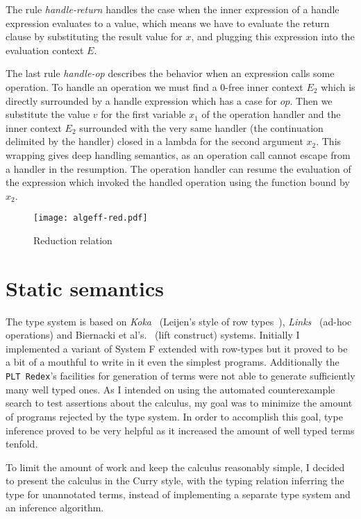 \documentclass[inz, english, longabstract]{iithesis}
\newcommand{\Redex}{\texttt{PLT Redex}}
\begin{document}
The rule \textit{handle-return} handles the case when the inner expression of a handle expression evaluates to a value, which means we have to evaluate the return clause by substituting the result value for $ x $, and plugging this expression into the evaluation context $ E $.

The last rule \textit{handle-op} describes the behavior when an expression calls some operation.
To handle an operation we must find a $0$-free inner context $ E_2 $ which is directly surrounded by a handle expression which has a case for $ op $.
Then we substitute the value $ v $ for the first variable $x_1$ of the operation handler and the inner context $ E_2 $ surrounded with the very same handler (the continuation delimited by the handler) closed in a lambda for the second argument $x_2$.
This wrapping gives deep handling semantics, as an operation call cannot escape from a handler in the resumption.
The operation handler can resume the evaluation of the expression which invoked the handled operation using the function bound by $x_2$.

\begin{figure}
  \centering
  \texttt{[image: algeff-red.pdf]}
  \caption{Reduction relation} 
  \label{fig:algeff-red}
\end{figure} 

\section{Static semantics}
The type system is based on \emph{Koka}~\cite{Leijen2014} (Leijen's style of row types~\cite{Leijen2005}), \emph{Links}~\cite{Hillerstrom2016} (ad-hoc operations) and Biernacki et al's.~\cite{Biernacki2017} (lift construct) systems.
Initially I implemented a variant of System F extended with row-types but it proved to be a bit of a mouthful to write in it even the simplest programs.
Additionally the \Redex{}'s facilities for generation of terms were not able to generate sufficiently many well typed ones.
As I intended on using the automated counterexample search to test assertions about the calculus, my goal was to minimize the amount of programs rejected by the type system.
In order to accomplish this goal, type inference proved to be very helpful as it increased the amount of well typed terms tenfold.

To limit the amount of work and keep the calculus reasonably simple, I decided to present the calculus in the Curry style, with the typing relation inferring the type for unannotated terms, instead of implementing a separate type system and an inference algorithm.
\end{document}
